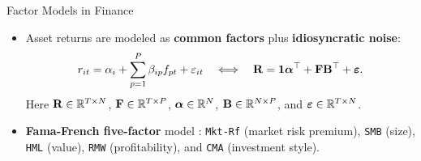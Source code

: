 \documentclass[10pt,aspectratio=169]{beamer}
\begin{document}
\begin{frame}[allowframebreaks]{Factor Models in Finance}
\small

  \begin{itemize}
    \item Asset returns are modeled as \textbf{common factors} plus \textbf{idiosyncratic noise}:
      \[
        r_{it} = \alpha_i + \sum_{p=1}^P \beta_{ip} f_{pt} + \varepsilon_{it}
        \quad\Longleftrightarrow\quad
        \mathbf{R} = \mathbf{1} \boldsymbol{\alpha}^\top + \mathbf{F}\mathbf{B}^\top + \boldsymbol{\varepsilon}.
      \]
      Here $\mathbf{R}\in\mathbb{R}^{T\times N}$, $\mathbf{F}\in\mathbb{R}^{T\times P}$, $\boldsymbol{\alpha}\in\mathbb{R}^N$, $\mathbf{B}\in\mathbb{R}^{N\times P}$, and $\boldsymbol{\varepsilon}\in\mathbb{R}^{T\times N}$.

    \item \textbf{Fama-French five-factor} model \parencite{FamaFrench2015FiveFactor}: \texttt{Mkt-Rf} (market risk premium), \texttt{SMB} (size), \texttt{HML} (value), \texttt{RMW} (profitability), and \texttt{CMA} (investment style).


\end{itemize}
\end{frame}
\end{document}
